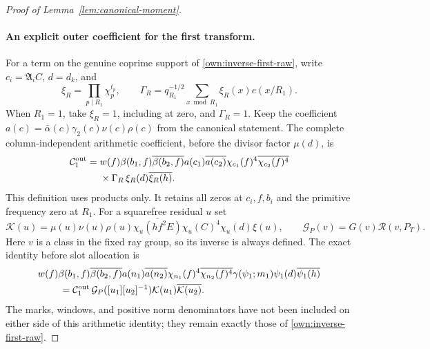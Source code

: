 \documentclass[12pt]{article}
\begin{document}
\begin{proof}[Proof of Lemma~\ref{lem:canonical-moment}]
\paragraph{An explicit outer coefficient for the first transform.}
For a term on the genuine coprime support of
\eqref{own:inverse-first-raw}, write \(c_i=\mathfrak A_iC\),
\(d=d_k\), and
\[
 \xi_R=\prod_{p\mid R_1}\chi_p^{t_p},\qquad
 \Gamma_R=q_{R_1}^{-1/2}
             \sum_{x\bmod R_1}\xi_R(x)e(x/R_1).
\]
When \(R_1=1\), take \(\xi_R=1\), including at zero, and
\(\Gamma_R=1\).  Keep the coefficient
\(a(c)=\bar\alpha(c)\gamma_2(c)\nu(c)\rho(c)\) from the
canonical statement.  The complete column-independent arithmetic
coefficient, before the divisor factor \(\mu(d)\), is
\begin{equation}\label{eq:inverse-first-outer-explicit}
\begin{split}
 \mathcal C^{\rm out}_1={}&w(f)\beta(b_1,f)\overline{\beta(b_2,f)}
       a(c_1)\overline{a(c_2)}
       \chi_{c_1}(f)^4\overline{\chi_{c_2}(f)^4}\\
 &\times\Gamma_R\,\xi_R(d)\overline{\xi_R(h)} .
\end{split}
\end{equation}
This definition uses products only.  It retains all zeros at
\(c_i,f,b_i\) and the primitive frequency zero at \(R_1\).
For a squarefree residual \(u\) set
\[
 \mathcal K(u)=\mu(u)\nu(u)\rho(u)
       \overline{\chi_u(hf^2E)}\chi_u(C)^4\chi_u(d)\xi(u),
 \qquad
 \mathcal G_P(v)=G(v)\mathcal R(v,P_T).
\]
Here \(v\) is a class in the fixed ray group, so its inverse is
always defined.  The exact identity before slot allocation is
\begin{equation}\label{eq:inverse-first-arithmetic-identity}
\begin{split}
 &w(f)\beta(b_1,f)\overline{\beta(b_2,f)}
  a(n_1)\overline{a(n_2)}
  \chi_{n_1}(f)^4\overline{\chi_{n_2}(f)^4}
  \gamma(\psi_1;m_1)\psi_1(d)\overline{\psi_1(h)}\\
 &\hspace{8mm}=
 \mathcal C^{\rm out}_1\,
 \mathcal G_P([u_1][u_2]^{-1})
       \mathcal K(u_1)\overline{\mathcal K(u_2)} .
\end{split}
\end{equation}
The marks, windows, and positive norm denominators have not been
included on either side of this arithmetic identity; they remain
exactly those of \eqref{own:inverse-first-raw}.


\end{proof}
\end{document}
